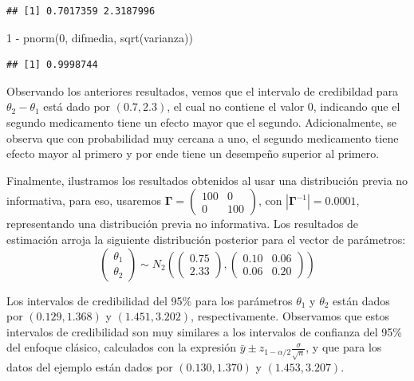 \documentclass[
  10pt,
  spanish,
]{book}
\newenvironment{Shaded}{\begin{snugshade}}{\end{snugshade}}
\newcommand{\DecValTok}[1]{\textcolor[rgb]{0.00,0.00,0.81}{#1}}
\newcommand{\FunctionTok}[1]{\textcolor[rgb]{0.00,0.00,0.00}{#1}}
\newcommand{\NormalTok}[1]{#1}
\newcommand{\SpecialCharTok}[1]{\textcolor[rgb]{0.00,0.00,0.00}{#1}}
\theoremstyle{definition}
\theoremstyle{definition}
\theoremstyle{definition}
\theoremstyle{definition}
\theoremstyle{remark}
\begin{document}
\begin{verbatim}
## [1] 0.7017359 2.3187996
\end{verbatim}

\begin{Shaded}
\begin{Highlighting}[]
\DecValTok{1} \SpecialCharTok{{-}} \FunctionTok{pnorm}\NormalTok{(}\DecValTok{0}\NormalTok{, difmedia, }\FunctionTok{sqrt}\NormalTok{(varianza))}
\end{Highlighting}
\end{Shaded}

\begin{verbatim}
## [1] 0.9998744
\end{verbatim}

Observando los anteriores resultados, vemos que el intervalo de credibildad para \(\theta_2-\theta_1\) está dado por \((0.7, 2.3)\), el cual no contiene el valor 0, indicando que el segundo medicamento tiene un efecto mayor que el segundo. Adicionalmente, se observa que con probabilidad muy cercana a uno, el segundo medicamento tiene efecto mayor al primero y por ende tiene un desempeño superior al primero.

Finalmente, ilustramos los resultados obtenidos al usar una distribución previa no informativa, para eso, usaremos \(\boldsymbol \Gamma=\begin{pmatrix}100&0\\ 0&100\end{pmatrix}\), con \(|\boldsymbol \Gamma^{-1}|=0.0001\), representando una distribución previa no informativa. Los resultados de estimación arroja la siguiente distribución posterior para el vector de parámetros:
\begin{equation*}
\begin{pmatrix}
\theta_1\\
\theta_2
\end{pmatrix}
\sim N_2\left(\begin{pmatrix}
0.75\\
2.33
\end{pmatrix},\begin{pmatrix}
0.10&0.06\\
0.06&0.20
\end{pmatrix}\right)
\end{equation*}

Los intervalos de credibilidad del 95\% para los parámetros \(\theta_1\) y \(\theta_2\) están dados por \((0.129, 1.368)\) y \((1.451, 3.202)\), respectivamente. Observamos que estos intervalos de credibilidad son muy similares a los intervalos de confianza del 95\% del enfoque clásico, calculados con la expresión \(\bar{y}\pm z_{1-\alpha/2}\frac{\sigma}{\sqrt{n}}\), y que para los datos del ejemplo están dados por \((0.130, 1.370)\) y \((1.453, 3.207)\).
\end{document}
